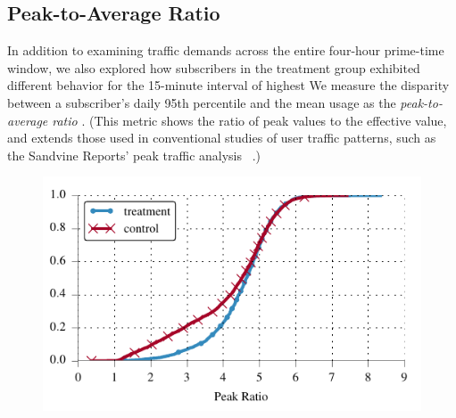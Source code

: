 \subsection{Peak-to-Average Ratio}\label{subsec:peakratio}

In addition to examining traffic demands across the entire four-hour
prime-time window, we also explored how subscribers in the treatment
group exhibited different behavior for the 15-minute interval of highest  We measure the disparity
between a subscriber's daily 95th percentile and 
the mean usage as the \emph{peak-to-average ratio} . (This metric
shows the ratio of peak values to the effective value, and extends those used
in conventional studies of user traffic patterns, such as the Sandvine
Reports' peak traffic analysis ~\cite{sandvine20141h}.) 

\begin{figure}[t]
\centering
\begin{minipage}{\linewidth}
\centering
\includegraphics[width=.75\linewidth]{figures/peakratio_cdf_mean-devices.pdf}
\caption{}
\label{fig:CDF-peak-ratio-mean}
\end{minipage}
\end{figure}

